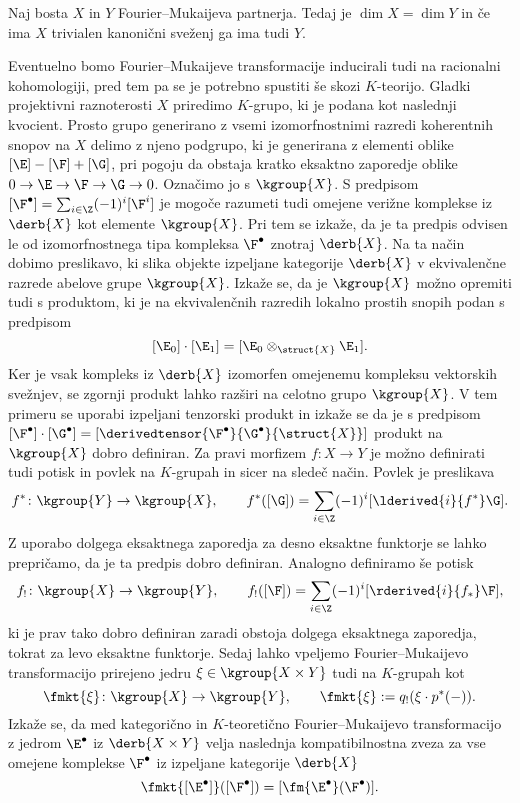 \begin{izrek}
    Naj bosta $X$ in $Y$ Fourier--Mukaijeva partnerja. Tedaj je $\dim X = \dim Y$ in če ima $X$ trivialen kanonični sveženj ga ima tudi $Y$. 
\end{izrek}

Eventuelno bomo Fourier--Mukaijeve transformacije inducirali tudi na racionalni kohomologiji, pred tem pa se je potrebno spustiti še skozi $K$-teorijo. Gladki projektivni raznoterosti $X$ priredimo $K$-grupo, ki je podana kot naslednji kvocient. Prosto grupo generirano z vsemi izomorfnostnimi razredi koherentnih snopov na $X$ delimo z njeno podgrupo, ki je generirana z elementi oblike $[\E] - [\F] + [\G]$, pri pogoju da obstaja kratko eksaktno zaporedje oblike $0 \to \E \to \F \to \G \to 0$. Označimo jo s $\kgroup{X}$. S predpisom $[\F^\bullet] = \sum_{i \in \Z} (-1)^i[\F^i]$ je mogoče razumeti tudi omejene verižne komplekse iz $\derb{X}$ kot elemente $\kgroup{X}$. Pri tem se izkaže, da je ta predpis odvisen le od izomorfnostnega tipa kompleksa $\F^\bullet$ znotraj $\derb{X}$. Na ta način dobimo preslikavo, ki slika objekte izpeljane kategorije $\derb{X}$ v ekvivalenčne razrede abelove grupe $\kgroup{X}$. Izkaže se, da je $\kgroup{X}$ možno opremiti tudi s produktom, ki je na ekvivalenčnih razredih lokalno prostih snopih podan s predpisom 
\[
    [\E_0] \cdot [\E_1] = [\E_0 \otimes_{\struct{X}} \E_1].
\]
Ker je vsak kompleks iz $\derb{X}$ izomorfen omejenemu kompleksu vektorskih svežnjev, se zgornji produkt lahko razširi na celotno grupo $\kgroup{X}$. V tem primeru se uporabi izpeljani tenzorski produkt in izkaže se da je s predpisom $[\F^\bullet]\cdot [\G^\bullet] = [\derivedtensor{\F^\bullet}{\G^\bullet}{\struct{X}}]$ produkt na $\kgroup{X}$ dobro definiran. 
Za pravi morfizem $f \colon X \to Y$ je možno definirati tudi potisk in povlek na $K$-grupah in sicer na sledeč način. 
Povlek je preslikava
\[
    f^* \colon \kgroup{Y} \to \kgroup{X}, \qquad f^*([\G]) = \sum_{i \in \Z}(-1)^i[\lderived{i}{f^*}\G].
\]
Z uporabo dolgega eksaktnega zaporedja za desno eksaktne funktorje se lahko prepričamo, da je ta predpis dobro definiran. Analogno definiramo še potisk
\[
    f_! \colon \kgroup{X} \to \kgroup{Y}, \qquad f_!([\F]) = \sum_{i \in \Z}(-1)^i[\rderived{i}{f_*}\F],
\]
ki je prav tako dobro definiran zaradi obstoja dolgega eksaktnega zaporedja, tokrat za levo eksaktne funktorje. Sedaj lahko vpeljemo Fourier--Mukaijevo transformacijo prirejeno jedru $\xi \in \kgroup{X \times Y}$ tudi na $K$-grupah kot
\[
    \fmkt{\xi} \colon \kgroup{X} \to \kgroup{Y}, \qquad \fmkt{\xi} := q_!(\xi \cdot p^*(-)).
\]
Izkaže se, da med kategorično in $K$-teoretično Fourier--Mukaijevo transformacijo z jedrom $\E^\bullet$ iz $\derb{X \times Y}$ velja naslednja kompatibilnostna zveza za vse omejene komplekse $\F^\bullet$ iz izpeljane kategorije $\derb{X}$
\[
    \fmkt{[\E^\bullet]}([\F^\bullet]) = [\fm{\E^\bullet}(\F^\bullet)].
\]

